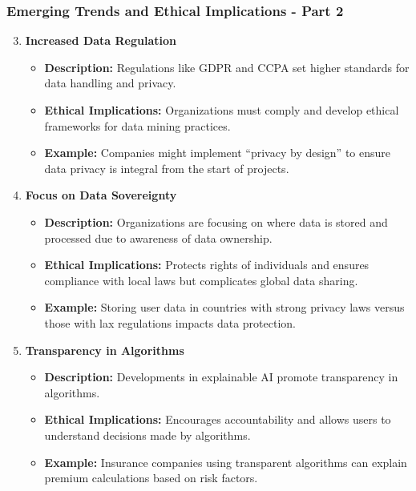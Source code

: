 \documentclass{beamer}
\begin{document}
\begin{frame}[fragile]
    \frametitle{Emerging Trends and Ethical Implications - Part 2}
    \begin{enumerate}
        \setcounter{enumi}{2} %
        \item \textbf{Increased Data Regulation}
            \begin{itemize}
                \item \textbf{Description:} Regulations like GDPR and CCPA set higher standards for data handling and privacy.
                \item \textbf{Ethical Implications:} Organizations must comply and develop ethical frameworks for data mining practices.
                \item \textbf{Example:} Companies might implement “privacy by design” to ensure data privacy is integral from the start of projects.
            \end{itemize}
        
        \item \textbf{Focus on Data Sovereignty}
            \begin{itemize}
                \item \textbf{Description:} Organizations are focusing on where data is stored and processed due to awareness of data ownership.
                \item \textbf{Ethical Implications:} Protects rights of individuals and ensures compliance with local laws but complicates global data sharing.
                \item \textbf{Example:} Storing user data in countries with strong privacy laws versus those with lax regulations impacts data protection.
            \end{itemize}
        
        \item \textbf{Transparency in Algorithms}
            \begin{itemize}
                \item \textbf{Description:} Developments in explainable AI promote transparency in algorithms.
                \item \textbf{Ethical Implications:} Encourages accountability and allows users to understand decisions made by algorithms.
                \item \textbf{Example:} Insurance companies using transparent algorithms can explain premium calculations based on risk factors.
            \end{itemize}
    \end{enumerate}
\end{frame}
\end{document}
